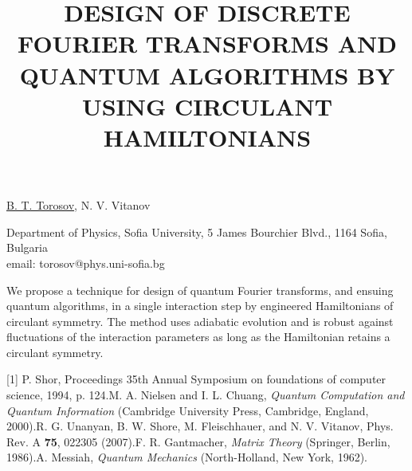 \title{DESIGN OF DISCRETE FOURIER TRANSFORMS AND QUANTUM ALGORITHMS BY USING CIRCULANT HAMILTONIANS}

\underline{B. T. Torosov}, N. V. Vitanov


Department of Physics, Sofia University, 5 James Bourchier Blvd., 1164
Sofia, Bulgaria\\
email: torosov@phys.uni-sofia.bg

We propose a technique for design of quantum Fourier transforms, and ensuing quantum algorithms, in a single interaction step 
by engineered Hamiltonians of circulant symmetry. The method uses adiabatic evolution and is robust against fluctuations of the 
interaction parameters as long as the Hamiltonian retains a circulant symmetry.

[1] P. Shor, Proceedings 35th Annual Symposium on foundations of computer science, 1994, p. 124.\newline
[2] M. A. Nielsen and I. L. Chuang, \emph{Quantum Computation and Quantum Information} (Cambridge University Press, Cambridge, England, 2000).\newline
[3] R. G. Unanyan, B. W. Shore, M. Fleischhauer, and N. V. Vitanov, Phys. Rev. A \textbf{75}, 022305 (2007).\newline
[4] F. R. Gantmacher, \emph{Matrix Theory} (Springer, Berlin, 1986).\newline
[5] A. Messiah, \emph{Quantum Mechanics} (North-Holland, New York, 1962).\newline

\vspace{\baselineskip}